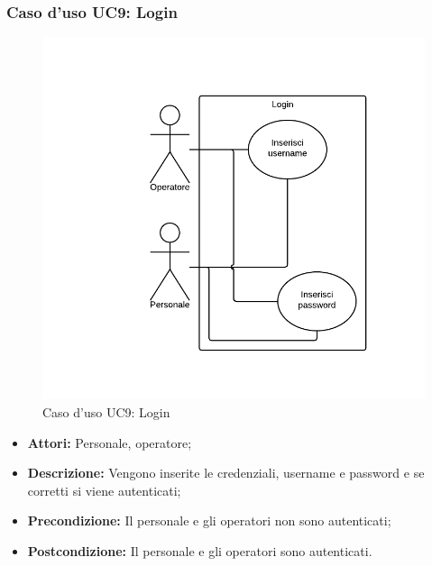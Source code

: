 \subsubsection{Caso d'uso UC9: Login}
\begin{figure}[H]
\centering
\includegraphics[width=1\textwidth]{images/UC9.png}
\caption{Caso d'uso UC9: Login}
\end{figure}
\begin{itemize}
\item \textbf{Attori:} Personale, operatore;
\item \textbf{Descrizione:} Vengono inserite le credenziali, username e password e se corretti si viene autenticati;
\item \textbf{Precondizione:} Il personale e gli operatori non sono autenticati;
\item \textbf{Postcondizione:}  Il personale e gli operatori sono autenticati.
\end{itemize}

